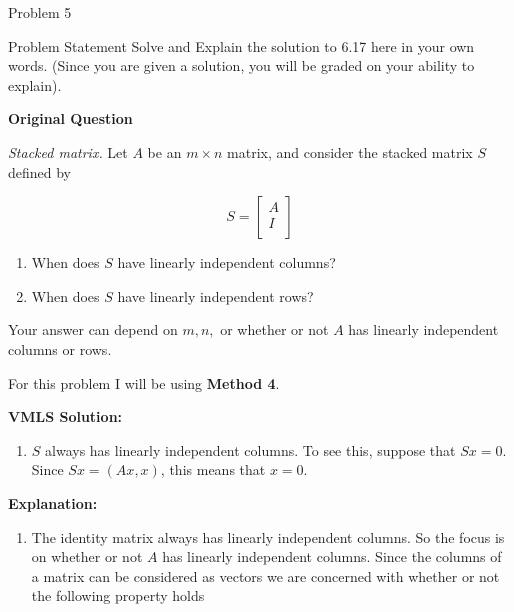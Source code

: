 \begin{problem}{Problem 5}
    \begin{statement}{Problem Statement}
        Solve and Explain the solution to 6.17 here in your own words. (Since you are given a solution, you will be graded on your ability to explain). \vspace*{1em}

        \noindent \textbf{Original Question} \vspace*{1em}

        \textit{Stacked matrix.} Let $A$ be an $m \times n$ matrix, and consider the stacked matrix $S$ defined by

        \begin{equation*}
            S =
            \begin{bmatrix}
                A \\
                I \\
            \end{bmatrix}
        \end{equation*}

        \begin{enumerate}[label = (\alph*)]
            \item When does $S$ have linearly independent columns?
            \item When does $S$ have linearly independent rows?
        \end{enumerate}
        Your answer can depend on $m, n,$ or whether or not $A$ has linearly independent columns or rows.
    \end{statement}

    \begin{highlight}
        For this problem I will be using \textbf{Method 4}. \vspace*{1em}

        \noindent \textbf{VMLS Solution:}

        \begin{enumerate}[label = (\alph*)]
            \item $S$ always has linearly independent columns. To see this, suppose that $Sx = 0$. Since $Sx = (Ax,x)$, this means that $x = 0$.
        \end{enumerate}

        \noindent \textbf{Explanation:}

        \begin{enumerate}[label = (\alph*)]
            \item The identity matrix always has linearly independent columns. So the focus is on whether or not $A$ has linearly independent columns. Since the columns of a matrix can be considered as vectors
            we are concerned with whether or not the following property holds
    

\end{enumerate}
\end{highlight}
\end{problem}
